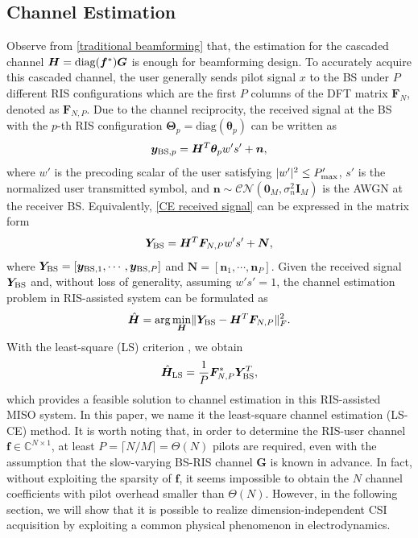 \documentclass[journal,twocolumn]{IEEEtran}
\theoremstyle{nonumberplain}
\def \diag {\text{diag}}
\def \arg {\text{arg}}
\begin{document}
\subsection{Channel Estimation}
\label{Channel Estimation}
    Observe from \eqref{traditional beamforming} that, the estimation for the cascaded channel ${\bm H} = {\rm diag}({\bm f}^{*})\bm G$ is enough for beamforming design.
    To accurately acquire this cascaded channel, the user generally sends pilot signal $x$ to the BS under $P$ different RIS configurations which are the first $P$ columns of the DFT matrix $\bm F_N$, denoted as $\bm F_{N,P}$. 
    Due to the channel reciprocity, the received signal at the BS with the $p$-th RIS configuration $\bm \Theta_{p}=\diag({\bm \theta}_p)$ can be written as \cite{atapattu2020reconfigurable}
    \begin{equation}
    \label{CE received signal}
        {\bm y}_{{\rm BS}, p} =\bm H^{T} {\bm \theta}_p w' s'+\bm n,
    \end{equation}
    where $w'$ is the precoding scalar of the user satisfying $|w'|^2 \leq P_{\rm max}'$, $s'$ is the normalized user transmitted symbol, and $\bm n\sim \mathcal{CN}\left( \bm 0_{M}, \sigma_{n}^{2}\bm I_{M}\right)$ is the \ac{AWGN} at the receiver BS.
    Equivalently, \eqref{CE received signal} can be expressed in the matrix form
    \begin{equation}
    \label{eqn:LS_CE model}
        {\bm Y}_{\rm BS}=\bm H^{T} \bm F_{N,P}w' s' + {\bm N},
    \end{equation}
    where ${\bm Y}_{\rm BS}=\left[\bm y_{{\rm BS}, 1},\cdots,\bm y_{{\rm BS}, P}\right]$ and $\bm N = \left[ \bm n_{1},\cdots,\bm n_{P}\right]$.
    Given the received signal $\bm Y_{\rm BS}$ and, without loss of generality, assuming $w's'=1$, the channel estimation problem in RIS-assisted system can be formulated as 
    \begin{equation}
        \hat{\bm H} = \arg\min_{\bm H} \lVert {\bm Y}_{\rm BS} - {\bm H^{T}} {\bm F}_{N,P}\rVert_{F}^2.
    \end{equation}
    With the least-square (LS) criterion \cite{kundu2021channel}, we obtain
    \begin{equation}
        \hat{\bm H}_{\rm LS} = \frac{1}{P}{\bm F}_{N,P}^{*}{\bm Y}_{\rm BS}^{T},
        \label{eqn:LS-CE}
    \end{equation}
    which provides a feasible solution to channel estimation in this RIS-assisted MISO system. In this paper, we name it the least-square channel estimation (LS-CE) method. 
    It is worth noting that, in order to determine the RIS-user channel $\bm{f}\in\mathbb{C}^{N\times 1}$, at least $P = \lceil N/M \rceil = {\Theta}(N)$ pilots are required, even with the assumption that the slow-varying \cite{Huchen} BS-RIS channel $\bm G$ is known in advance. 
    In fact, without exploiting the sparsity of $\bm f$, it seems impossible to obtain the $N$ channel coefficients with pilot overhead smaller than $\Theta(N)$. 
    However, in the following section, we will show that it is possible to realize dimension-independent CSI acquisition by exploiting a common physical phenomenon in electrodynamics. 
\end{document}
